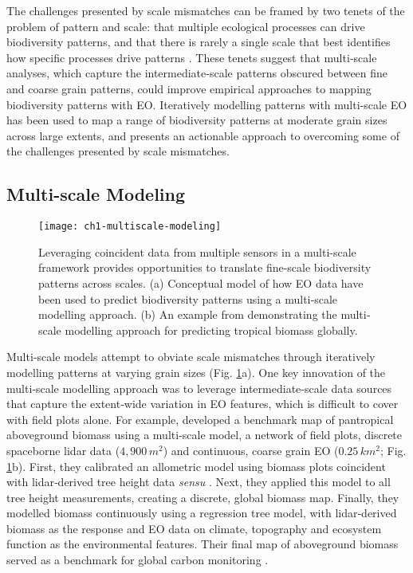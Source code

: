 The challenges presented by scale mismatches can be framed by two tenets of the problem of pattern and scale: that multiple ecological processes can drive biodiversity patterns, and that there is rarely a single scale that best identifies how specific processes drive patterns \cite{Wiens1989-yi,Levin1992-ga}. These tenets suggest that multi‐scale analyses, which capture the intermediate‐scale patterns obscured between fine and coarse grain patterns, could improve empirical approaches to mapping biodiversity patterns with EO. Iteratively modelling patterns with multi‐scale EO has been used to map a range of biodiversity patterns at moderate grain sizes across large extents, and presents an actionable approach to overcoming some of the challenges presented by scale mismatches.

\subsection{Multi-scale Modeling}

\begin{figure}[!ht]
\texttt{[image: ch1-multiscale-modeling]}
\centering
\caption[Conceptual synthesis of how biodiversity patterns have been modelled using EO data at multiple spatial scales.]{Leveraging coincident data from multiple sensors in a multi-scale framework provides opportunities to translate fine-scale biodiversity patterns across scales. (a) Conceptual model of how EO data have been used to predict biodiversity patterns using a multi‐scale modelling approach. (b) An example from \cite{Baccini2012-ow} demonstrating the multi‐scale modelling approach for predicting tropical biomass globally.}
\label{fig:multiscale-modeling}
\end{figure}

Multi‐scale models attempt to obviate scale mismatches through iteratively modelling patterns at varying grain sizes (Fig. \ref{fig:multiscale-modeling}a). One key innovation of the multi‐scale modelling approach was to leverage intermediate‐scale data sources that capture the extent‐wide variation in EO features, which is difficult to cover with field plots alone. For example, \cite{Baccini2012-ow} developed a benchmark map of pantropical aboveground biomass using a multi‐scale model, a network of field plots, discrete spaceborne lidar data ($4,900\, m^2$) and continuous, coarse grain EO ($0.25\, km^2$; Fig. \ref{fig:multiscale-modeling}b). First, they calibrated an allometric model using biomass plots coincident with lidar‐derived tree height data \textit{sensu} \cite{Chave2005-rs}. Next, they applied this model to all tree height measurements, creating a discrete, global biomass map. Finally, they modelled biomass continuously using a regression tree model, with lidar‐derived biomass as the response and EO data on climate, topography and ecosystem function as the environmental features. Their final map of aboveground biomass served as a benchmark for global carbon monitoring \cite{Ciais2014-rb}.

